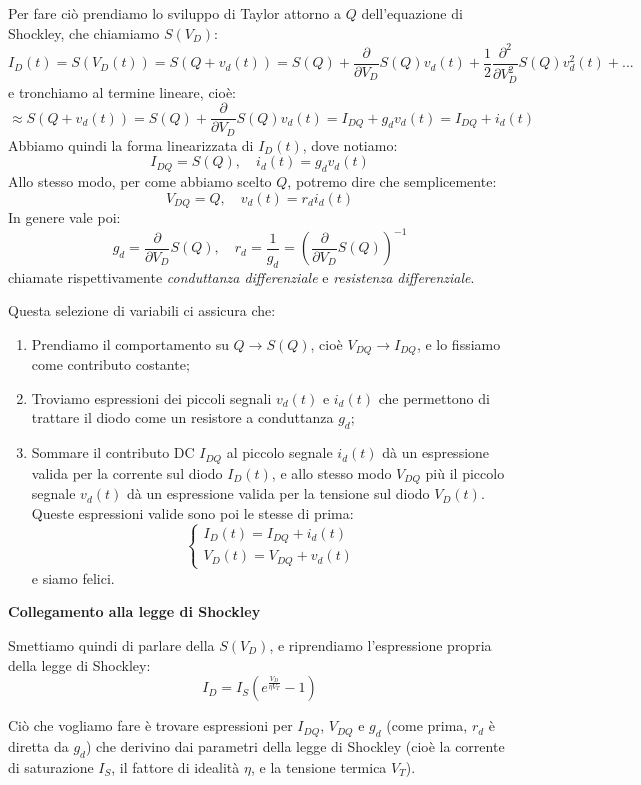 \documentclass[a4paper,11pt]{article}
\begin{document}
Per fare ciò prendiamo lo sviluppo di Taylor attorno a $Q$ dell'equazione di Shockley, che chiamiamo $S(V_D)$:
$$
I_D(t) = S(V_D(t)) = S(Q + v_d(t)) = S(Q) + \frac{\partial}{\partial V_D} S(Q) v_d(t) + \frac{1}{2} \frac{\partial^2}{\partial V_D^2} S(Q) v_d^2(t) + ...
$$
e tronchiamo al termine lineare, cioè:
$$
\approx S(Q + v_d(t)) = S(Q) + \frac{\partial}{\partial V_D} S(Q) v_d(t)
= I_{DQ} + g_d v_d(t) = I_{DQ} + i_d(t)
$$
Abbiamo quindi la forma linearizzata di $I_D(t)$, dove notiamo:
$$
I_{DQ} = S(Q), \quad i_d(t) = g_d v_d(t)
$$
Allo stesso modo, per come abbiamo scelto $Q$, potremo dire che semplicemente:
$$
V_{DQ} = Q, \quad v_d(t) = r_d i_d(t)
$$
In genere vale poi:
$$
g_d = \frac{\partial}{\partial V_D} S(Q), \quad r_d = \frac{1}{g_d} = \left( \frac{\partial}{\partial V_D} S(Q) \right)^{-1}
$$
chiamate rispettivamente \textit{conduttanza differenziale} e \textit{resistenza differenziale}.

\newpage

Questa selezione di variabili ci assicura che:
\begin{enumerate}
	\item Prendiamo il comportamento su $Q \rightarrow S(Q)$, cioè $V_{DQ} \rightarrow I_{DQ}$, e lo fissiamo come contributo costante;
	\item Troviamo espressioni dei piccoli segnali $v_d(t)$ e $i_d(t)$ che permettono di trattare il diodo come un resistore a conduttanza $g_d$;
	\item Sommare il contributo DC $I_{DQ}$ al piccolo segnale $i_d(t)$ dà un espressione valida per la corrente sul diodo $I_D(t)$, e allo stesso modo $V_{DQ}$ più il piccolo segnale $v_d(t)$ dà un espressione valida per la tensione sul diodo $V_D(t)$. Queste espressioni valide sono poi le stesse di prima:
$$
\begin{cases}
I_D(t) = I_{DQ} + i_d(t) \\
V_D(t) = V_{DQ} + v_d(t)
\end{cases}
$$
e siamo felici.
\end{enumerate}

\par\smallskip

\noindent
\textbf{\textsf{Collegamento alla legge di Shockley}}

\noindent
Smettiamo quindi di parlare della $S(V_D)$, e riprendiamo l'espressione propria della legge di Shockley:
$$
I_D = I_S \left( e^{\frac{V_D}{\eta V_T}} - 1\right)
$$

Ciò che vogliamo fare è trovare espressioni per $I_{DQ}$, $V_{DQ}$ e $g_d$ (come prima, $r_d$ è diretta da $g_d$) che derivino dai parametri della legge di Shockley (cioè la corrente di saturazione $I_S$, il fattore di idealità $\eta$, e la tensione termica $V_T$).
\end{document}
